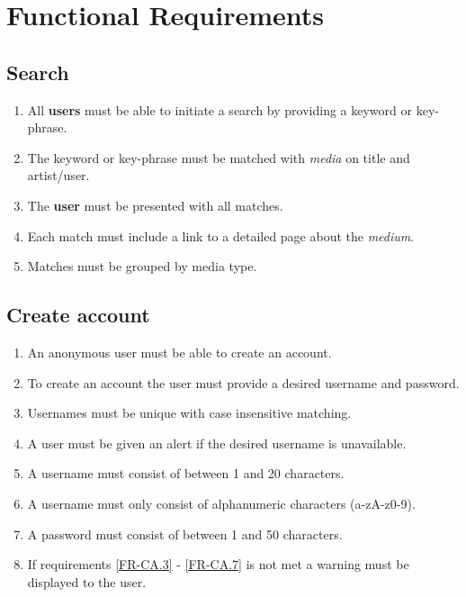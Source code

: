 


% 

\section{Functional Requirements}

\subsection {Search}

\begin{enumerate}[label=FR-\twodigits*]

	\item All \textbf{users} must be able to initiate a search by providing a keyword or key-phrase.
	\item The keyword or key-phrase must be matched with \textit{media} on title and artist/user.
	\item The \textbf{user} must be presented with all matches.
	\item Each match must include a link to a detailed page about the \textit{medium}.
	\item Matches must be grouped by media type. 
\end{enumerate}	
			
\subsection{Create account}

\begin{enumerate}[label=FR-\twodigits*, resume]
	\item An anonymous user must be able to create an account.
	\item To create an account the user must provide a desired username and password.
	\item Usernames must be unique with case insensitive matching. \label{FR-CA.3}
	\item A user must be given an alert if the desired username is unavailable.
	\item A username must consist of between 1 and 20 characters.
	\item A username must only consist of alphanumeric characters (a-zA-z0-9).
	\item A password must consist of between 1 and 50 characters. \label{FR-CA.7}
	\item If requirements \ref{FR-CA.3} - \ref{FR-CA.7} is not met a warning must be displayed to the user.
\end{enumerate}
	
